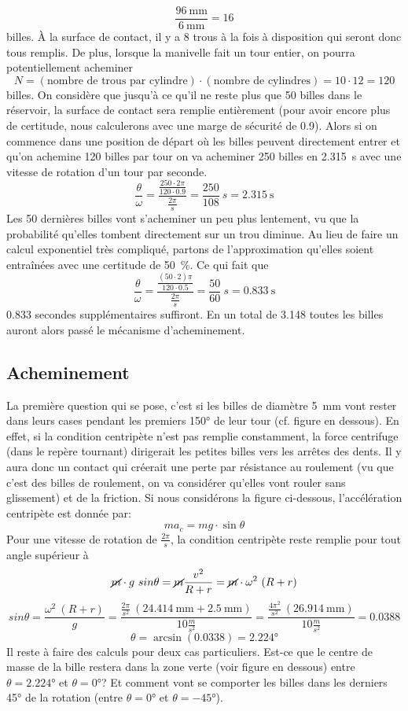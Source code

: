 \[\frac{\SI{96}{\milli\metre}}{\SI{6}{\milli\metre}} = \num{16}\]
billes. À la surface de contact, il y a \num{8} trous à la fois à disposition qui seront donc tous remplis. De plus, lorsque la manivelle fait un tour entier, on pourra potentiellement acheminer 
\[N = (\text{nombre de trous par cylindre}) \cdot (\text{nombre de cylindres}) = \num{10} \cdot \num{12} = \num{120}\]
billes.
On considère que jusqu'à ce qu'il ne reste plus que \num{50} billes dans le réservoir, la surface de contact sera remplie entièrement (pour avoir encore plus de certitude, nous calculerons avec une marge de sécurité de \num{0.9}).
Alors si on commence dans une position de départ où les billes peuvent directement entrer et qu'on achemine \num{120} billes par tour on va acheminer \num{250} billes en \SI{2.315}{\s} avec une vitesse de rotation d'un tour par seconde.
\[\frac{\theta}{\omega} = \frac{\frac{250 \cdot 2\pi}{120 \cdot 0.9}}{\frac{2\pi}{s}} = \frac{250}{108} \ s = \SI{2.315}{\s}\]
Les \num{50} dernières billes vont s'acheminer un peu plus lentement, vu que la probabilité qu'elles tombent directement sur un trou diminue. Au lieu de faire un calcul exponentiel très compliqué, partons de l'approximation qu'elles soient entraînées avec une certitude de \SI{50}{\percent}. Ce qui fait que
\[\frac{\theta}{\omega} = \frac{\frac{(50 \cdot 2)\pi}{120 \cdot 0.5}}{\frac{2 \pi}{s}} = \frac{50}{60} \ s = \SI{0.833}{\s}\]
0.833 secondes supplémentaires suffiront.
En un total de \SI{3.148}{\sec} toutes les billes auront alors passé le mécanisme d'acheminement.


\subsection{Acheminement}
La première question qui se pose, c'est si les billes de diamètre \SI{5}{\mm} vont rester dans leurs cases pendant les premiers \ang{150} de leur tour (cf. figure en dessous). En effet, si la condition centripète n'est pas remplie constamment, la force centrifuge (dans le repère tournant) dirigerait les petites billes vers les arrêtes des dents. Il y aura donc un contact qui créerait une perte par résistance au roulement (vu que c'est des billes de roulement, on va considérer qu'elles vont rouler sans glissement) et de la friction. Si nous considérons la figure ci-dessous, l'accélération centripète est donnée par:
\[ma_{c} = mg \cdot \sin\theta\]
Pour une vitesse de rotation de \(\frac{2 \pi}{s}\), la condition centripète reste remplie pour tout angle supérieur à 
\[\cancel{m} \cdot g \ sin\theta = \cancel{m} \frac{v^{2}}{R + r} = \cancel{m} \cdot \omega^{2} \ (R +r)\]
\[sin \theta = \frac{\omega^{2} \ (R + r)}{g} = \frac{\frac{2 \pi}{s^{2}}\ (\SI{24.414}{\milli\metre} + \SI{2.5}{\milli\metre})}{10\frac{m}{s^{2}}} = \frac{\frac{4 \pi^{2}}{s^{2}} \ (\SI{26.914}{\milli\metre})}{10\frac{m}{s^{2}}} = 0.0388\]
\[\theta = \arcsin(0.0338) = \ang{2.224}\]
Il reste à faire des calculs pour deux cas particuliers. Est-ce que le centre de masse de la bille restera dans la zone verte (voir figure en dessous) entre $\theta = \ang{2.224}$ et $\theta = \ang{0}$? Et comment vont se comporter les billes dans les derniers \ang{45} de la rotation (entre $\theta = \ang{0}$ et $\theta = \ang{-45}$).
